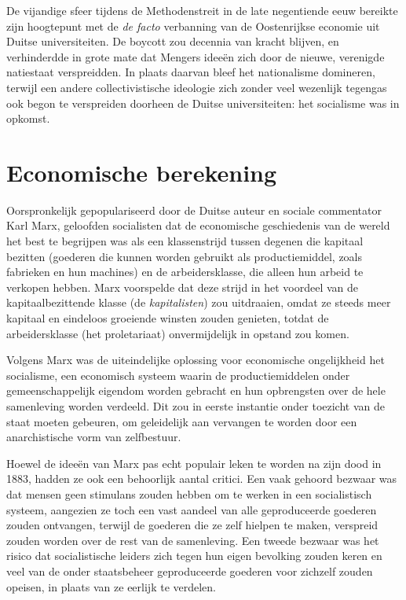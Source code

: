 \documentclass[
  a5paper,
  smalldemyvopaper,11pt,twoside,onecolumn,openright,extrafontsizes]{memoir}
\begin{document}
De vijandige sfeer tijdens de Methodenstreit in de late negentiende eeuw
bereikte zijn hoogtepunt met de \emph{de facto} verbanning van de
Oostenrijkse economie uit Duitse universiteiten. De boycott zou decennia
van kracht blijven, en verhinderdde in grote mate dat Mengers ideeën
zich door de nieuwe, verenigde natiestaat verspreidden. In plaats
daarvan bleef het nationalisme domineren, terwijl een andere
collectivistische ideologie zich zonder veel wezenlijk tegengas ook
begon te verspreiden doorheen de Duitse universiteiten: het socialisme
was in opkomst.

\section{Economische berekening}\label{economische-berekening}

Oorspronkelijk gepopulariseerd door de Duitse auteur en sociale
commentator Karl Marx, geloofden socialisten dat de economische
geschiedenis van de wereld het best te begrijpen was als een
klassenstrijd tussen degenen die kapitaal bezitten (goederen die kunnen
worden gebruikt als productiemiddel, zoals fabrieken en hun machines) en
de arbeidersklasse, die alleen hun arbeid te verkopen hebben. Marx
voorspelde dat deze strijd in het voordeel van de kapitaalbezittende
klasse (de \emph{kapitalisten}) zou uitdraaien, omdat ze steeds meer
kapitaal en eindeloos groeiende winsten zouden genieten, totdat de
arbeidersklasse (het proletariaat) onvermijdelijk in opstand zou komen.

Volgens Marx was de uiteindelijke oplossing voor economische
ongelijkheid het socialisme, een economisch systeem waarin de
productiemiddelen onder gemeenschappelijk eigendom worden gebracht en
hun opbrengsten over de hele samenleving worden verdeeld. Dit zou in
eerste instantie onder toezicht van de staat moeten gebeuren, om
geleidelijk aan vervangen te worden door een anarchistische vorm van
zelfbestuur.

Hoewel de ideeën van Marx pas echt populair leken te worden na zijn dood
in 1883, hadden ze ook een behoorlijk aantal critici. Een vaak gehoord
bezwaar was dat mensen geen stimulans zouden hebben om te werken in een
socialistisch systeem, aangezien ze toch een vast aandeel van alle
geproduceerde goederen zouden ontvangen, terwijl de goederen die ze zelf
hielpen te maken, verspreid zouden worden over de rest van de
samenleving. Een tweede bezwaar was het risico dat socialistische
leiders zich tegen hun eigen bevolking zouden keren en veel van de onder
staatsbeheer geproduceerde goederen voor zichzelf zouden opeisen, in
plaats van ze eerlijk te verdelen.
\end{document}
